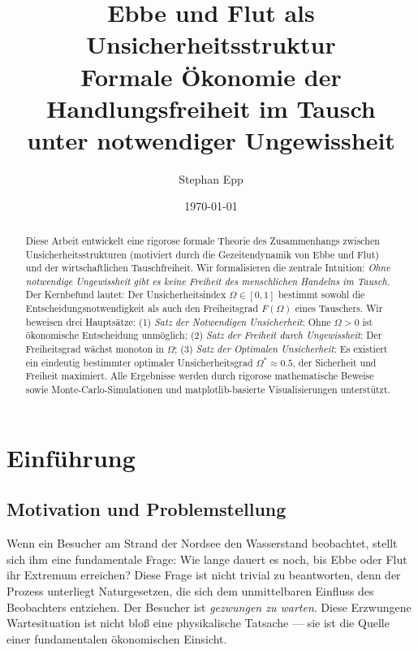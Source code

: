 \documentclass[a4paper,12pt]{article}
\title{\textbf{Ebbe und Flut als Unsicherheitsstruktur}\\
\large Formale Ökonomie der Handlungsfreiheit im Tausch\\ unter notwendiger Ungewissheit}
\author{Stephan Epp}
\date{\today}
\theoremstyle{definition}
\begin{document}
\maketitle

\begin{abstract}
Diese Arbeit entwickelt eine rigorose formale Theorie des Zusammenhangs zwischen Unsicherheitsstrukturen (motiviert durch die Gezeitendynamik von Ebbe und Flut) und der wirtschaftlichen Tauschfreiheit. Wir formalisieren die zentrale Intuition: \emph{Ohne notwendige Ungewissheit gibt es keine Freiheit des menschlichen Handelns im Tausch.} Der Kernbefund lautet: Der Unsicherheitsindex $\Omega \in [0,1]$ bestimmt sowohl die Entscheidungsnotwendigkeit als auch den Freiheitsgrad $F(\Omega)$ eines Tauschers. Wir beweisen drei Hauptsätze: (1) \emph{Satz der Notwendigen Unsicherheit}: Ohne $\Omega > 0$ ist ökonomische Entscheidung unmöglich; (2) \emph{Satz der Freiheit durch Ungewissheit}: Der Freiheitsgrad wächst monoton in $\Omega$; (3) \emph{Satz der Optimalen Unsicherheit}: Es existiert ein eindeutig bestimmter optimaler Unsicherheitsgrad $\Omega^* \approx 0.5$, der Sicherheit und Freiheit maximiert. Alle Ergebnisse werden durch rigorose mathematische Beweise sowie Monte-Carlo-Simulationen und matplotlib-basierte Visualisierungen unterstützt.
\end{abstract}

\tableofcontents
\newpage

\section{Einführung}

\subsection{Motivation und Problemstellung}

Wenn ein Besucher am Strand der Nordsee den Wasserstand beobachtet, stellt sich ihm eine fundamentale Frage: Wie lange dauert es noch, bis Ebbe oder Flut ihr Extremum erreichen? Diese Frage ist nicht trivial zu beantworten, denn der Prozess unterliegt Naturgesetzen, die sich dem unmittelbaren Einfluss des Beobachters entziehen. Der Besucher ist \emph{gezwungen zu warten}. Diese Erzwungene Wartesituation ist nicht bloß eine physikalische Tatsache --- sie ist die Quelle einer fundamentalen ökonomischen Einsicht.
\end{document}
